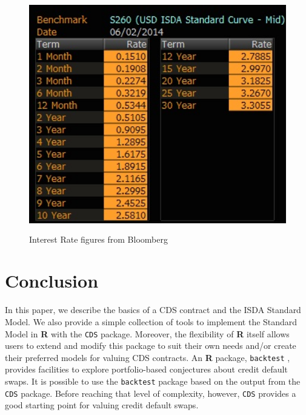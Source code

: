 \documentclass[a4paper]{article}
\begin{document}
\begin{figure}[ht!]
\centering
\includegraphics[width=6in, height=4in]{BloombergIRJun2.png}
\caption{Interest Rate figures from Bloomberg}
\end{figure}


\section{Conclusion}

In this paper, we describe the basics of a CDS contract and the ISDA
Standard Model. We also provide a simple collection
of tools to implement the Standard Model in \textbf{R} with the
\texttt{CDS} package. Moreover, the flexibility of \textbf{R} itself
allows users to extend and modify this package to suit their own
needs and/or create their preferred models for valuing CDS contracts. An
\textbf{R} package, \texttt{backtest} \cite{kane:david}, provides
facilities to explore portfolio-based conjectures about credit default
swaps. It is possible to use the \texttt{backtest} package based on
the output from the \texttt{CDS} package. Before reaching that level
of complexity, however, \texttt{CDS} provides a good starting point
for valuing credit default swaps.



\end{document}
